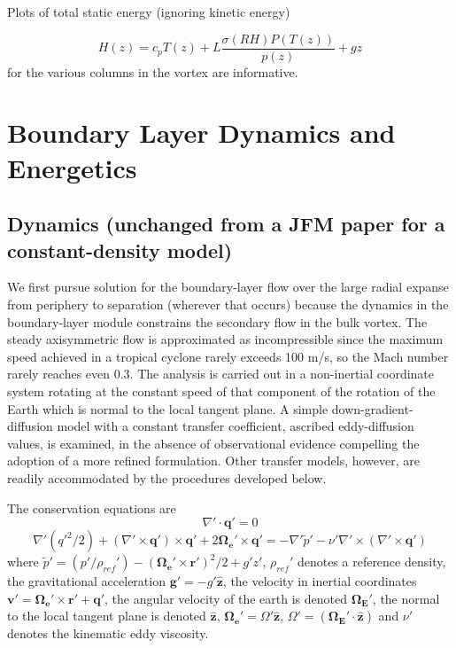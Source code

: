 \documentclass[preprint, prX]{revtex4}
\newcommand{\vhat}[1]{\hat{\bm{#1}}}
\begin{document}
Plots of total static energy (ignoring kinetic energy)

\begin{equation}
	H(z) = c_p T(z) + L \frac{\sigma(RH) P(T(z))}{p(z)} + g z
\end{equation}
for the various columns in the vortex are informative.

\section{Boundary Layer Dynamics and Energetics}

\subsection{Dynamics (unchanged from a JFM paper for a constant-density model)}

We first pursue solution for the boundary-layer flow over the large radial expanse from periphery to separation (wherever that occurs) because the dynamics in the boundary-layer module constrains the secondary flow in the bulk vortex. The steady axisymmetric flow is approximated as incompressible since the maximum speed achieved in a tropical cyclone rarely exceeds 100 m/s, so the Mach number rarely reaches even 0.3. The analysis is carried out in a non-inertial coordinate system rotating at the constant speed of that component of the rotation of the Earth which is normal to the local tangent plane. A simple down-gradient-diffusion model with a constant transfer coefficient, ascribed eddy-diffusion values, is examined, in the absence of observational evidence compelling the adoption of a more refined formulation. Other transfer models, however, are readily accommodated by the procedures developed below.

The conservation equations are
\begin{equation}
\nabla' \cdot \mathbf{q'}=0
\end{equation}
\begin{equation}
\nabla'(q'^2/2) +(\nabla' \times \mathbf{q'})\times \mathbf{q'} + 2 \mathbf{\Omega_e'} \times \mathbf{q'}=-\nabla' \tilde{p}' - \nu' \nabla' \times (\nabla' \times \mathbf{q'})
\end{equation}
where $\tilde{p}' = (p'/\rho_{ref}') - (\mathbf{\Omega_e'} \times \mathbf{r'})^2/2 + g' z'$, $\rho_{ref}'$ denotes a reference density, the gravitational acceleration $\mathbf{g'} = −g' \vhat{z}$, the velocity in inertial coordinates $\mathbf{v'} = \mathbf{\Omega_e'} \times \mathbf{r'} + \mathbf{q'}$,
the angular velocity of the earth is denoted $\mathbf{\Omega_E'}$, the normal to the local tangent plane is denoted $\vhat{z}$, $\mathbf{\Omega_e'} = \Omega' \vhat{z}$, $\Omega'= (\mathbf{\Omega_E'} \cdot \vhat{z})$ and $\nu'$ denotes the kinematic eddy viscosity.
\end{document}
